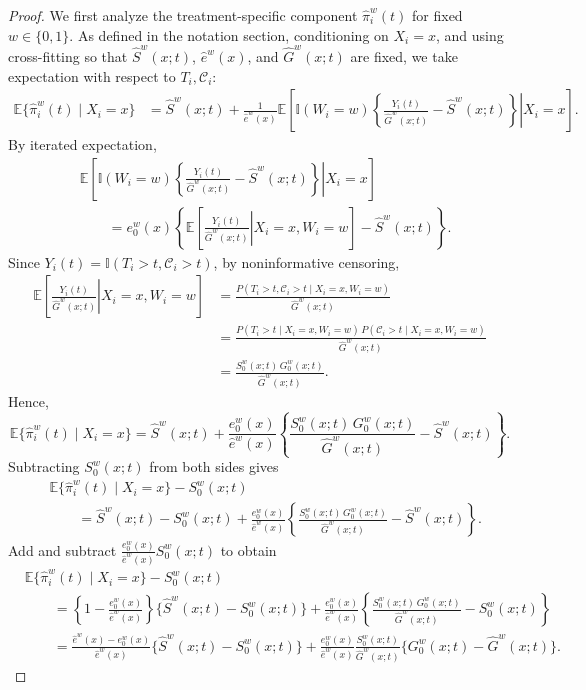 \documentclass{article}
\newenvironment{proofof}[1]
{\renewcommand{\proofname}{Proof of #1}\begin{proof}}
{\end{proof}}
\begin{document}
\begin{proofof} {Theorem~\ref{thm:bias_full}:}
    We first analyze the treatment-specific component \(\hat\pi_i^w(t)\) for fixed \(w\in\{0,1\}\).  As defined in the notation section,
    conditioning on \(X_i=x\), and using cross-fitting so that \(\hat S^w(x;t)\), \(\hat e^w(x)\), and \(\hat G^w(x;t)\) are fixed, we take expectation with respect to  \(T_i, \mathcal C_i\):
\begin{align*}
\mathbb E\{\hat\pi_i^w(t)\mid X_i=x\}
&=
\hat S^w(x;t)
+
\frac{1}{\hat e^w(x)}
\mathbb E\!\left[
\left.
\mathbb I(W_i=w)
\left\{
\frac{Y_i(t)}{\hat G^w(x;t)}
-
\hat S^w(x;t)
\right\}
\right|X_i=x
\right].
\end{align*}
By iterated expectation,
\begin{align*}
&\mathbb E\!\left[
\left.
\mathbb I(W_i=w)
\left\{
\frac{Y_i(t)}{\hat G^w(x;t)}
-
\hat S^w(x;t)
\right\}
\right|X_i=x
\right]\\
&\qquad=
e_0^w(x)
\left\{
\mathbb E\!\left[
\left.\frac{Y_i(t)}{\hat G^w(x;t)}\right|X_i=x,W_i=w
\right]
-
\hat S^w(x;t)
\right\}.
\end{align*}
Since \(Y_i(t)=\mathbb I(T_i>t,\mathcal C_i>t)\), by noninformative censoring,
\begin{align*}
\mathbb E\!\left[
\left.\frac{Y_i(t)}{\hat G^w(x;t)}\right|X_i=x,W_i=w
\right]
&=
\frac{P(T_i>t,\mathcal C_i>t\mid X_i=x,W_i=w)}{\hat G^w(x;t)}\\
&=
\frac{P(T_i>t\mid X_i=x,W_i=w)\,P(\mathcal C_i>t\mid X_i=x,W_i=w)}{\hat G^w(x;t)}\\
&=
\frac{S_0^w(x;t)\,G_0^w(x;t)}{\hat G^w(x;t)}.
\end{align*}
Hence,
\[
\mathbb E\{\hat\pi_i^w(t)\mid X_i=x\}
=
\hat S^w(x;t)
+
\frac{e_0^w(x)}{\hat e^w(x)}
\left\{
\frac{S_0^w(x;t)\,G_0^w(x;t)}{\hat G^w(x;t)}
-
\hat S^w(x;t)
\right\}.
\]
Subtracting \(S_0^w(x;t)\) from both sides gives
\begin{align*}
&\mathbb E\{\hat\pi_i^w(t)\mid X_i=x\} - S_0^w(x;t)\\
&\qquad=
\hat S^w(x;t)-S_0^w(x;t)
+
\frac{e_0^w(x)}{\hat e^w(x)}
\left\{
\frac{S_0^w(x;t)\,G_0^w(x;t)}{\hat G^w(x;t)}
-
\hat S^w(x;t)
\right\}.
\end{align*}
Add and subtract \(\frac{e_0^w(x)}{\hat e^w(x)}S_0^w(x;t)\) to obtain
\begin{align*}
&\mathbb E\{\hat\pi_i^w(t)\mid X_i=x\} - S_0^w(x;t)\\
&\qquad=
\left\{1-\frac{e_0^w(x)}{\hat e^w(x)}\right\}
\big\{\hat S^w(x;t)-S_0^w(x;t)\big\}
+
\frac{e_0^w(x)}{\hat e^w(x)}
\left\{
\frac{S_0^w(x;t)\,G_0^w(x;t)}{\hat G^w(x;t)}
-
S_0^w(x;t)
\right\}\\
&\qquad=
\frac{\hat e^w(x)-e_0^w(x)}{\hat e^w(x)}
\big\{\hat S^w(x;t)-S_0^w(x;t)\big\}
+
\frac{e_0^w(x)}{\hat e^w(x)}
\frac{S_0^w(x;t)}{\hat G^w(x;t)}
\big\{G_0^w(x;t)-\hat G^w(x;t)\big\}.
\end{align*}


\end{proofof}
\end{document}
